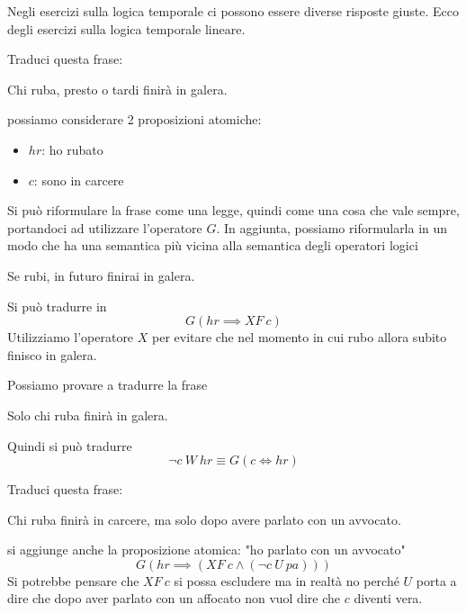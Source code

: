 Negli esercizi sulla logica temporale ci possono essere diverse risposte giuste.
Ecco degli esercizi sulla logica temporale lineare.
\begin{esempio}
    Traduci questa frase:
    \begin{center}
        Chi ruba, presto o tardi finirà in galera.
    \end{center}
    possiamo considerare 2 proposizioni atomiche:
    \begin{itemize}
        \item $hr$: ho rubato 
        \item $c$: sono in carcere
    \end{itemize}
    Si può riformulare la frase come una legge, quindi come una cosa che vale sempre,
    portandoci ad utilizzare l'operatore $G$. In aggiunta, possiamo riformularla
    in un modo che ha una semantica più vicina alla semantica degli operatori logici
    \begin{center}
        Se rubi, in futuro finirai in galera.
    \end{center}
    Si può tradurre in
    \begin{equation}
        G(hr\implies XF \ c)
    \end{equation}
    Utilizziamo l'operatore $X$ per evitare che nel momento in cui rubo allora 
    subito finisco in galera.

    Possiamo provare a tradurre la frase
    \begin{center}
        Solo chi ruba finirà in galera.
    \end{center}
    Quindi si può tradurre 
    \begin{equation}
        \lnot c \ W \ hr \equiv G(c \iff hr)
    \end{equation}
\end{esempio}
\begin{esempio}
    Traduci questa frase:
    \begin{center}
        Chi ruba finirà in carcere, ma solo dopo avere parlato con un avvocato.
    \end{center}
    si aggiunge anche la proposizione atomica: "ho parlato con un avvocato"
    \begin{equation}
        G(hr\implies (XF \ c \land (\lnot c \ U \ pa)))
    \end{equation}
    Si potrebbe pensare che $XF \ c$ si possa escludere ma in realtà no perché
    $U$ porta a dire che dopo aver parlato con un affocato non vuol dire che $c$
    diventi vera.
\end{esempio}
